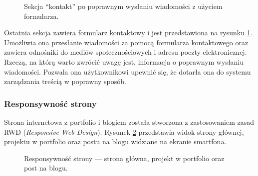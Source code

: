 \documentclass[a4paper, 12pt]{article}
\numberwithin{figure}{section}
\begin{document}
\begin{sloppypar}
\begin{figure}[H] 
    \centering
   \caption{Sekcja ``kontakt'' po poprawnym wysłaniu wiadomości z użyciem formularza.}
   \label{fig:gotowa-aplikacja-10.jpg}
\end{figure}

Ostatnia sekcja zawiera formularz kontaktowy i jest przedstawiona na rysunku \ref{fig:gotowa-aplikacja-10.jpg}. Umożliwia ona przesłanie wiadomości za pomocą formularza kontaktowego oraz zawiera odnośniki do mediów społecznościowych i adresu poczty elektronicznej. Rzeczą, na którą warto zwrócić uwagę jest, informacja o poprawnym wysłaniu wiadomości. Pozwala ona użytkownikowi upewnić się, że dotarła ona do systemu zarządzania treścią w poprawny sposób. 



\subsubsection*{Responsywność strony}

Strona internetowa z portfolio i blogiem została stworzona z zastosowaniem zasad RWD (\textit{Responsive Web Design}). Rysunek \ref{fig:resposywnosc.jpg} przedstawia widok strony głównej, projektu w portfolio oraz postu na blogu widziane na ekranie smartfona. 

\begin{figure}[H] 
    \centering
   \caption{Responsywność strony --- strona główna, projekt w portfolio oraz post na blogu.}
   \label{fig:resposywnosc.jpg}
\end{figure}


\end{sloppypar}
\end{document}
